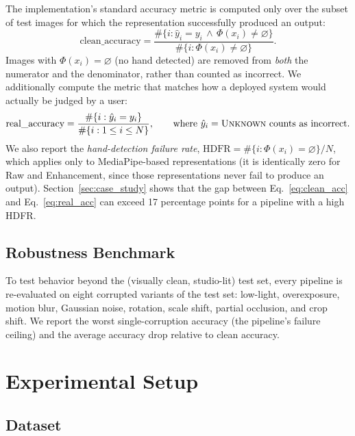 \documentclass[11pt,a4paper]{article}
\begin{document}
The implementation's standard accuracy metric is computed only over the
subset of test images for which the representation successfully produced an
output:
\begin{equation}
  \text{clean\_accuracy} =
  \frac{\#\{i : \hat{y}_i = y_i \,\wedge\, \Phi(x_i) \neq \varnothing\}}
       {\#\{i : \Phi(x_i) \neq \varnothing\}}.
  \label{eq:clean_acc}
\end{equation}
Images with $\Phi(x_i) = \varnothing$ (no hand detected) are removed from
\emph{both} the numerator and the denominator, rather than counted as
incorrect. We additionally compute the metric that matches how a deployed
system would actually be judged by a user:
\begin{equation}
  \text{real\_accuracy} =
  \frac{\#\{i : \hat{y}_i = y_i\}}
       {\#\{i : 1 \le i \le N\}},
  \qquad \text{where } \hat{y}_i = \textsc{Unknown} \text{ counts as incorrect.}
  \label{eq:real_acc}
\end{equation}
We also report the \emph{hand-detection failure rate},
$\text{HDFR} = \#\{i : \Phi(x_i) = \varnothing\} / N$, which applies only to
MediaPipe-based representations (it is identically zero for Raw and
Enhancement, since those representations never fail to produce an output).
Section~\ref{sec:case_study} shows that the gap between
Eq.~\eqref{eq:clean_acc} and Eq.~\eqref{eq:real_acc} can exceed 17 percentage
points for a pipeline with a high HDFR.

\subsection{Robustness Benchmark}

To test behavior beyond the (visually clean, studio-lit) test set, every
pipeline is re-evaluated on eight corrupted variants of the test set:
low-light, overexposure, motion blur, Gaussian noise, rotation, scale shift,
partial occlusion, and crop shift. We report the worst single-corruption
accuracy (the pipeline's failure ceiling) and the average accuracy drop
relative to clean accuracy.

\section{Experimental Setup}

\subsection{Dataset}
\end{document}
